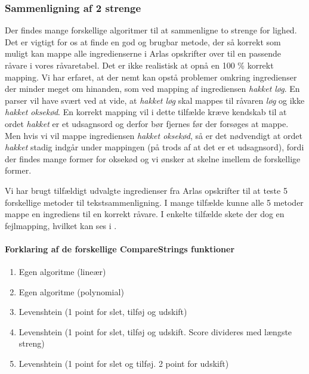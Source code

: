 \subsubsection{Sammenligning af 2 strenge}
Der findes mange forskellige algoritmer til at sammenligne to strenge for lighed. Det er vigtigt for os at finde en god og brugbar metode, der så korrekt som muligt kan mappe alle ingredienserne i Arlas opskrifter over til en passende råvare i vores råvaretabel. Det er ikke realistisk at opnå en 100 \% korrekt mapping. Vi har erfaret, at der nemt kan opstå problemer omkring ingredienser der minder meget om hinanden, som \fx ved mapping af ingrediensen \textit{hakket løg}. En parser vil have svært ved at vide, at \textit{hakket løg} skal mappes til råvaren \textit{løg} og ikke \textit{hakket oksekød}. En korrekt mapping vil i dette tilfælde kræve kendskab til at ordet \textit{hakket} er et udsagnsord og derfor bør fjernes før der forsøges at mappe. Men hvis vi vil mappe ingrediensen \textit{hakket oksekød}, så er det nødvendigt at ordet \textit{hakket} stadig indgår under mappingen (på trods af at det er et udsagnsord), fordi der findes mange former for oksekød og vi ønsker at skelne imellem de forskellige former.

Vi har brugt tilfældigt udvalgte ingredienser fra Arlas opskrifter til at teste 5 forskellige metoder til tekstsammenligning. I mange tilfælde kunne alle 5 metoder mappe en ingrediens til en korrekt råvare. I enkelte tilfælde skete der dog en fejlmapping, hvilket kan ses i .

\paragraph{Forklaring af de forskellige \textbf{CompareStrings} funktioner}
\begin{enumerate}
\item Egen algoritme (lineær)
\item Egen algoritme (polynomial)
\item Levenshtein (1 point for slet, tilføj og udskift) %
\item Levenshtein (1 point for slet, tilføj og udskift. Score divideres med længste streng) %
\item Levenshtein (1 point for slet og tilføj. 2 point for udskift) %
\end{enumerate}


